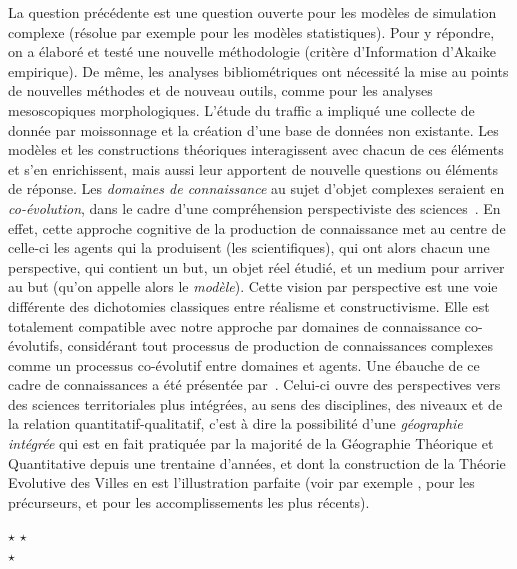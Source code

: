 La question précédente est une question ouverte pour les modèles de simulation complexe (résolue par exemple pour les modèles statistiques). Pour y répondre, on a élaboré et testé une nouvelle méthodologie (critère d'Information d'Akaike empirique). De même, les analyses bibliométriques ont nécessité la mise au points de nouvelles méthodes et de nouveau outils, comme pour les analyses mesoscopiques morphologiques. L'étude du traffic a impliqué une collecte de donnée par moissonnage et la création d'une base de données non existante. Les modèles et les constructions théoriques interagissent avec chacun de ces éléments et s'en enrichissent, mais aussi leur apportent de nouvelle questions ou éléments de réponse. Les \emph{domaines de connaissance} au sujet d'objet complexes seraient en \emph{co-évolution}, dans le cadre d'une compréhension perspectiviste des sciences~\cite{giere2010scientific}. En effet, cette approche cognitive de la production de connaissance met au centre de celle-ci les agents qui la produisent (les scientifiques), qui ont alors chacun une perspective, qui contient un but, un objet réel étudié, et un medium pour arriver au but (qu'on appelle alors le \emph{modèle}). Cette vision par perspective est une voie différente des dichotomies classiques entre réalisme et constructivisme. Elle est totalement compatible avec notre approche par domaines de connaissance co-évolutifs, considérant tout processus de production de connaissances complexes comme un processus co-évolutif entre domaines et agents. Une ébauche de ce cadre de connaissances a été présentée par~\cite{raimbault:halshs-01505084}. Celui-ci ouvre des perspectives vers des sciences territoriales plus intégrées, au sens des disciplines, des niveaux et de la relation quantitatif-qualitatif, c'est à dire la possibilité d'une \emph{géographie intégrée} qui est en fait pratiquée par la majorité de la Géographie Théorique et Quantitative depuis une trentaine d'années, et dont la construction de la Théorie Evolutive des Villes en est l'illustration parfaite (voir par exemple \cite{pumain1997pour}, \cite{sanders1997simpop} pour les précurseurs, et \cite{pumain2017urban} pour les accomplissements les plus récents).

\medskip


\medskip

{\centering
$\star$ \hspace{1cm}$\star$\\
\medskip
\hfill$\star$\hfill
}


